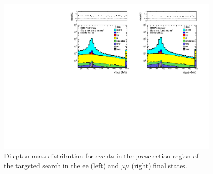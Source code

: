 \begin{figure}[hbt]
  \begin{center}
	\includegraphics[width=1.0\linewidth]{plots/dilmass_2jets_19fb.pdf}
	\caption{
	  \label{fig:dilmass_2j_targeted}\protect 
	  Dilepton mass distribution for events in the preselection region of the targeted search
	  in the ee (left) and $\mu\mu$ (right) final states.}




  \end{center}
\end{figure}

